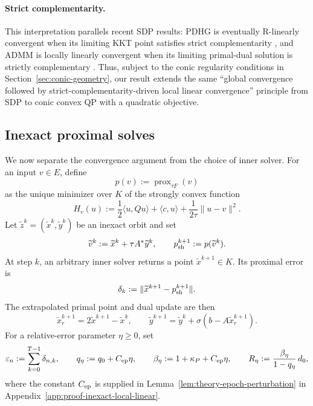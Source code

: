 \documentclass[letterpaper]{article} %
\theoremstyle{definition}
\theoremstyle{remark}
\begin{document}
\paragraph{Strict complementarity.} This interpretation parallels
recent SDP results: PDHG is eventually R-linearly convergent when its limiting
KKT point satisfies strict complementarity \cite{jiang2026pdhgsdp}, and
ADMM is locally linearly convergent when its limiting primal-dual solution is
strictly complementary \cite{kang2025admmsdp}.  Thus, subject to the conic
regularity conditions in Section~\ref{sec:conic-geometry}, our result extends
the same ``global convergence followed by strict-complementarity-driven local
linear convergence'' principle from SDP to conic convex QP with a quadratic
objective.



\subsection{Inexact proximal solves}

We now separate the convergence argument from the choice of inner solver.
For an input $v\in E$, define
\[
    p(v):=\operatorname{prox}_{\tau F}(v)
\]
as the unique minimizer over $K$ of the strongly convex function
\begin{equation}
\label{eq:theory-inner-objective}
    H_v(u)
    :=
    \frac12\langle u,Qu\rangle+\langle c,u\rangle
    +\frac{1}{2\tau}\|u-v\|^2.
\end{equation}
Let $\widetilde z^k=(\widetilde x^k,\widetilde y^k)$ be an inexact orbit and
set
\begin{equation}
\label{eq:theory-shadow-prox}
    \widetilde v^k
    :=
    \widetilde x^k+\tau A^*\widetilde y^k,
    \qquad
    p_{\rm sh}^{k+1}
    :=
    p(\widetilde v^k).
\end{equation}
At step $k$, an arbitrary inner solver returns a point
$\widetilde x^{k+1}\in K$.  Its proximal error is
\begin{equation}
\label{eq:general-inexact-error}
    \delta_k
    :=
    \|\widetilde x^{k+1}-p_{\rm sh}^{k+1}\|.
\end{equation}
The extrapolated primal point and dual update are then
\[
    \widetilde x_r^{k+1}
    =
    2\widetilde x^{k+1}-\widetilde x^k,
    \qquad
    \widetilde y^{k+1}
    =
    \widetilde y^k+\sigma(b-A\widetilde x_r^{k+1}).
\]
For a relative-error parameter $\eta\ge0$, set
\[
  \varepsilon_n:=\sum_{k=0}^{T-1}\delta_{n,k},
    \qquad  q_\eta:=q_0+C_{\rm ep}\eta,
    \qquad
    \beta_\eta:=1+\kappa_P+C_{\rm ep}\eta,
    \qquad
    R_\eta:=\frac{\beta_\eta}{1-q_\eta}\,d_0,
\]
where the constant
$C_{\rm ep}$ is supplied in 
Lemma~\ref{lem:theory-epoch-perturbation} in
Appendix~\ref{app:proof-inexact-local-linear}.
\edef\epochperturbationnumber{\thetheorem}
\end{document}
